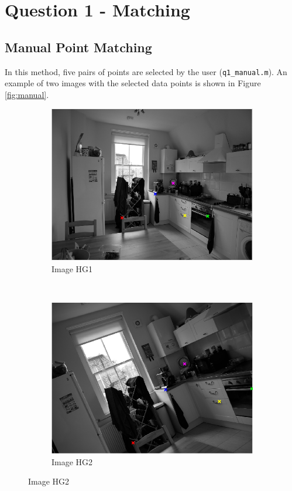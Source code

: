 \documentclass[a4paper, 10pt, conference]{ieeeconf}
\begin{document}
\section{Question 1 - Matching}
\subsection{Manual Point Matching}

In this method, five pairs of points are selected by the user (\texttt{q1\_manual.m}). An example of two images with the selected data points is shown in Figure \ref{fig:manual}.

\begin{figure}[!ht]
  \captionsetup[subfigure]{position=b}
  \centering
    \begin{subfigure}{0.45\linewidth}
      \includegraphics[width=\textwidth]{pic/manualA}
      \caption{Image HG1}
      \label{fig:manualA}
    \end{subfigure}
    ~
    \begin{subfigure}{0.45\linewidth}
      \includegraphics[width=\textwidth]{pic/manualB}
      \caption{Image HG2}
      \label{fig:manualB}
    \end{subfigure}


\end{figure}
\end{document}
